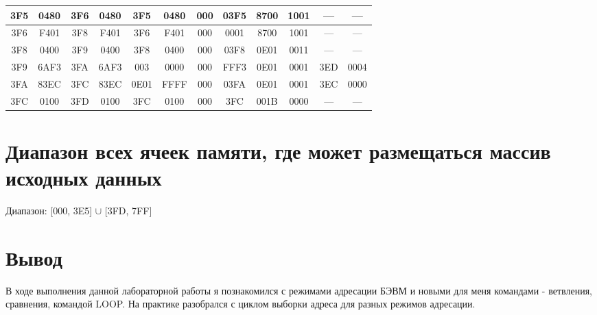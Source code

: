 \begin{flushleft}
\begin{tabular}{|c|c|c|c|c|c|c|c|c|c|c|c|}
3F5 & 0480 & 3F6 & 0480 & 3F5 & 0480 & 000 & 03F5 & 8700 & 1001 & --- & ---
\\
\hline
3F6 & F401 & 3F8 & F401 & 3F6 & F401 & 000 & 0001 & 8700 & 1001 & --- & ---
\\
\hline
3F8 & 0400 & 3F9 & 0400 & 3F8 & 0400 & 000 & 03F8 & 0E01 & 0011 & --- & ---
\\
\hline
3F9 & 6AF3 & 3FA & 6AF3 & 003 & 0000 & 000 & FFF3 & 0E01 & 0001 & 3ED & 0004
\\
\hline
3FA & 83EC & 3FC & 83EC & 0E01 & FFFF & 000 & 03FA & 0E01 & 0001 & 3EC & 0000
\\
\hline
\hline
3FC & 0100 & 3FD & 0100 & 3FC & 0100 & 000 & 3FC & 001B & 0000 & --- & --- \\
\hline
\end{tabular}
\end{flushleft}

\section{Диапазон всех ячеек памяти, где может размещаться массив исходных данных}
Диапазон: [000, 3E5] $\cup$ [3FD, 7FF]

\section{Вывод}
В ходе выполнения данной лабораторной работы я познакомился с режимами адресации БЭВМ и новыми для меня командами - ветвления, сравнения, командой LOOP. На практике разобрался с циклом выборки адреса для разных режимов адресации.